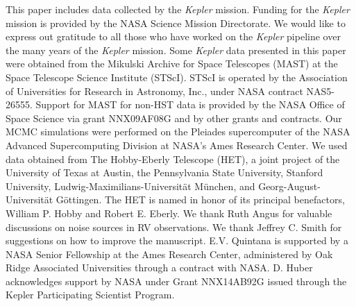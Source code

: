 \documentclass[apjl]{emulateapj}
\begin{document}

\acknowledgments
This paper includes data collected by the \emph{Kepler} mission. Funding for the \emph{Kepler} mission is provided by the NASA Science Mission Directorate. We would like to express out gratitude to all those who have worked on the \emph{Kepler} pipeline over the many years of the \emph{Kepler} mission. Some \emph{Kepler} data presented in this paper were obtained from the Mikulski Archive for Space Telescopes (MAST) at the Space Telescope Science Institute (STScI). STScI is operated by the Association of Universities for Research in Astronomy, Inc., under NASA contract NAS5-26555. Support for MAST for non-HST data is provided by the NASA Office of Space Science via grant NNX09AF08G and by other grants and contracts. Our MCMC simulations were performed on the Pleiades supercomputer of the NASA Advanced Supercomputing Division at NASA's Ames Research Center. We used data obtained from The Hobby-Eberly Telescope (HET), a joint project of the University of Texas at Austin, the Pennsylvania State University, Stanford University, Ludwig-Maximilians-Universit\"{a}t M\"{u}nchen, and Georg-August-Universit\"{a}t G\"{o}ttingen. The HET is named in honor of its principal benefactors, William P. Hobby and Robert E. Eberly. We thank Ruth Angus for valuable discussions on noise sources in RV observations. We thank Jeffrey C. Smith for suggestions on how to improve the manuscript. E.V. Quintana is supported by a NASA Senior Fellowship at the Ames Research Center, administered by Oak Ridge Associated Universities through a contract with NASA. D. Huber acknowledges support by NASA under Grant NNX14AB92G issued through the Kepler Participating Scientist Program.






\end{document}
